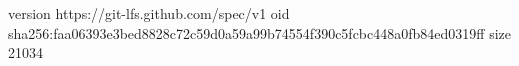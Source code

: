 version https://git-lfs.github.com/spec/v1
oid sha256:faa06393e3bed8828c72c59d0a59a99b74554f390c5fcbc448a0fb84ed0319ff
size 21034
